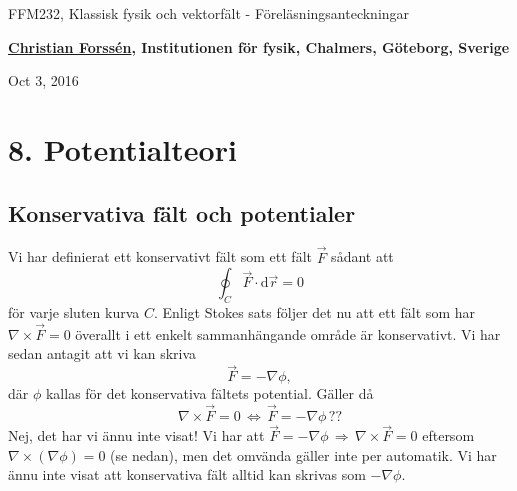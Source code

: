 \documentclass[%
oneside,                 %
final,                   %
10pt]{article}
\begin{document}






\thispagestyle{empty}

\begin{center}
{\LARGE\bf
\begin{spacing}{1.25}
FFM232, Klassisk fysik och vektorfält - Föreläsningsanteckningar
\end{spacing}
}
\end{center}


\begin{center}
{\bf \href{{http://fy.chalmers.se/subatom/tsp/}}{Christian Forssén}, Institutionen för fysik, Chalmers, Göteborg, Sverige${}^{}$} \\ [0mm]
\end{center}

\begin{center}
\end{center}
    

\begin{center}
Oct 3, 2016
\end{center}

\vspace{1cm}


\section{8. Potentialteori}

\subsection{Konservativa fält och potentialer}

Vi har definierat ett konservativt fält som ett fält $\vec{F}$ sådant att
\begin{equation}
  \oint_C \vec{F}\cdot \mbox{d}\vec{r} = 0
\end{equation}
för varje sluten kurva $C$.  Enligt Stokes sats följer det nu att ett fält som har $\nabla \times \vec{F} = 0$ överallt i ett enkelt sammanhängande område är konservativt. Vi har sedan antagit att vi kan skriva
\begin{equation}
\vec{F} = - \nabla \phi,
\end{equation}
där $\phi$ kallas för det konservativa fältets potential. Gäller då 
$$
\nabla \times \vec{F} = 0 \, \Longleftrightarrow \, \vec{F} = - \nabla \phi \, ??
$$
Nej, det har vi ännu inte visat! Vi har att $\vec{F} = - \nabla \phi \, \Rightarrow \, \nabla \times \vec{F} = 0 $ eftersom $\nabla \times ( \nabla \phi) = 0$ (se nedan), men det omvända gäller inte per automatik. Vi har ännu inte visat att konservativa fält alltid kan skrivas som $-\nabla \phi$.
\end{document}
